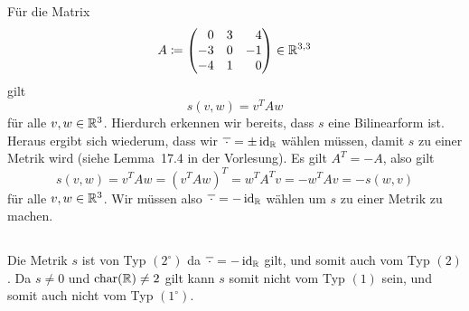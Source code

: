 \section{}





\subsection{}

Für die Matrix
\[
            A
  \defined  \begin{pmatrix*}[r]
              0  & 3 &  4  \\
              -3  & 0 & -1  \\
              -4  & 1 &  0
            \end{pmatrix*}
  \in       \matrices{3}{\Real}
\]
gilt
\[
    s(v,w)
  = v^T A w
\]
für alle $v, w \in \mathbb{R}^3$.
Hierdurch erkennen wir bereits, dass $s$ eine Bilinearform ist.
Heraus ergibt sich wiederum, dass wir $\overline{\,\cdot\,} = \pm \operatorname{id}_{\mathbb{R}}$ wählen müssen, damit $s$ zu einer Metrik wird (siehe Lemma~17.4 in der Vorlesung).
Es gilt $A^T = -A$, also gilt
\[
    s(v,w)
  = v^T A w
  = (v^T A w)^T
  = w^T A^T v
  = - w^T A v
  = -s(w,v)
\]
für alle $v, w \in \mathbb{R}^3$.
Wir müssen also $\overline{\,\cdot\,} = -\operatorname{id}_{\mathbb{R}}$ wählen um $s$ zu einer Metrik zu machen.





\subsection{}

Die Metrik $s$ ist von Typ $(2^\circ)$ da $\overline{\,\cdot\,} = -\operatorname{id}_{\mathbb{R}}$ gilt, und somit auch vom Typ $(2)$.
Da $s \neq 0$ und $\operatorname{char}(\mathbb{R}) \neq 2$ gilt kann $s$ somit nicht vom Typ $(1)$ sein, und somit auch nicht vom Typ $(1^\circ)$.





\subsection{}

